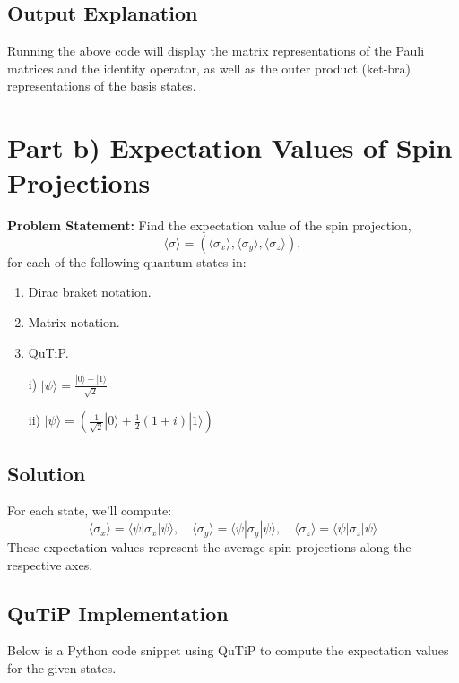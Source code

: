 \documentclass[12pt]{article}
\begin{document}
\subsection{Output Explanation}

Running the above code will display the matrix representations of the Pauli matrices and the identity operator, as well as the outer product (ket-bra) representations of the basis states.

\newpage

\section{Part b) Expectation Values of Spin Projections}

\textbf{Problem Statement:} Find the expectation value of the spin projection,
\[
\langle \sigma \rangle = \left( \langle \sigma_x \rangle, \langle \sigma_y \rangle, \langle \sigma_z \rangle \right),
\]
for each of the following quantum states in:
\begin{enumerate}
    \item Dirac braket notation.
    \item Matrix notation.
    \item QuTiP.
\end{enumerate}
\begin{enumerate}
    \item[i)] \( |\psi\rangle = \frac{|0\rangle + |1\rangle}{\sqrt{2}} \)
    \item[ii)] \( |\psi\rangle = \left( \frac{1}{\sqrt{2}} |0\rangle + \frac{1}{2}(1 + i)|1\rangle \right) \)
\end{enumerate}

\subsection{Solution}

For each state, we'll compute:
\[
\langle \sigma_x \rangle = \langle \psi | \sigma_x | \psi \rangle, \quad
\langle \sigma_y \rangle = \langle \psi | \sigma_y | \psi \rangle, \quad
\langle \sigma_z \rangle = \langle \psi | \sigma_z | \psi \rangle
\]
These expectation values represent the average spin projections along the respective axes.

\subsection{QuTiP Implementation}

Below is a Python code snippet using QuTiP to compute the expectation values for the given states.
\end{document}

